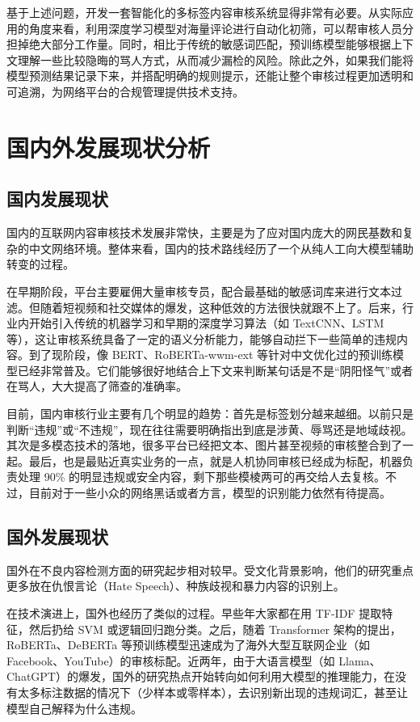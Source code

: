 \documentclass[twoside]{thesis-cls-Miya} %
\begin{document}
基于上述问题，开发一套智能化的多标签内容审核系统显得非常有必要。从实际应用的角度来看，利用深度学习模型对海量评论进行自动化初筛，可以帮审核人员分担掉绝大部分工作量。同时，相比于传统的敏感词匹配，预训练模型能够根据上下文理解一些比较隐晦的骂人方式，从而减少漏检的风险。除此之外，如果我们能将模型预测结果记录下来，并搭配明确的规则提示，还能让整个审核过程更加透明和可追溯，为网络平台的合规管理提供技术支持。

\section{国内外发展现状分析}

\subsection{国内发展现状}
国内的互联网内容审核技术发展非常快，主要是为了应对国内庞大的网民基数和复杂的中文网络环境。整体来看，国内的技术路线经历了一个从纯人工向大模型辅助转变的过程。

在早期阶段，平台主要雇佣大量审核专员，配合最基础的敏感词库来进行文本过滤。但随着短视频和社交媒体的爆发，这种低效的方法很快就跟不上了。后来，行业内开始引入传统的机器学习和早期的深度学习算法（如 TextCNN、LSTM 等），这让审核系统具备了一定的语义分析能力，能够自动拦下一些简单的违规内容。到了现阶段，像 BERT、RoBERTa-wwm-ext 等针对中文优化过的预训练模型已经非常普及。它们能够很好地结合上下文来判断某句话是不是“阴阳怪气”或者在骂人，大大提高了筛查的准确率。

目前，国内审核行业主要有几个明显的趋势：首先是标签划分越来越细。以前只是判断“违规”或“不违规”，现在往往需要明确指出到底是涉黄、辱骂还是地域歧视。其次是多模态技术的落地，很多平台已经把文本、图片甚至视频的审核整合到了一起。最后，也是最贴近真实业务的一点，就是人机协同审核已经成为标配，机器负责处理 90\% 的明显违规或安全内容，剩下那些模棱两可的再交给人去复核。不过，目前对于一些小众的网络黑话或者方言，模型的识别能力依然有待提高。

\subsection{国外发展现状}
国外在不良内容检测方面的研究起步相对较早。受文化背景影响，他们的研究重点更多放在仇恨言论（Hate Speech）、种族歧视和暴力内容的识别上。

在技术演进上，国外也经历了类似的过程。早些年大家都在用 TF-IDF 提取特征，然后扔给 SVM 或逻辑回归跑分类。之后，随着 Transformer 架构的提出，RoBERTa、DeBERTa 等预训练模型迅速成为了海外大型互联网企业（如 Facebook、YouTube）的审核标配。近两年，由于大语言模型（如 Llama、ChatGPT）的爆发，国外的研究热点开始转向如何利用大模型的推理能力，在没有太多标注数据的情况下（少样本或零样本），去识别新出现的违规词汇，甚至让模型自己解释为什么违规。
\end{document}
